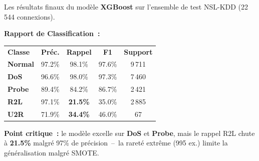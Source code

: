 \documentclass{article}
\newlength{\colW}  \setlength{\colW}{180mm}
\newlength{\gapW}  \setlength{\gapW}{15mm}
\newcommand{\bodyfont}{\fontsize{15.3}{20.5}\selectfont}
\newcommand{\smallfont}{\fontsize{13.5}{18}\selectfont}
\newcommand{\labelfont}{\fontsize{13.5}{17}\selectfont\bfseries}
\begin{document}
\hspace{\gapW}%
\begin{minipage}[t]{\colW}

\begin{tcolorbox}[pc, title={\faTrophy\; R\'esultats D\'etaill\'es}]
\bodyfont\color{TextMain}
Les r\'esultats finaux du mod\`ele \textbf{XGBoost} sur l'ensemble de test NSL-KDD (22\,544 connexions).

\vspace{5mm}
{\labelfont\color{CyanAccent}Rapport de Classification~:}
\vspace{2mm}

{\smallfont
\setlength{\tabcolsep}{2.5mm}
\renewcommand{\arraystretch}{1.5}
\begin{tabular}{@{}lcccc@{}}
\rowcolor{TableHead}
  \textcolor{TextMain}{\textbf{Classe}} &
  \textcolor{TextMain}{\textbf{Pr\'ec.}} &
  \textcolor{TextMain}{\textbf{Rappel}} &
  \textcolor{TextMain}{\textbf{F1}} &
  \textcolor{TextMain}{\textbf{Support}} \\
\textcolor{NormalColor}{\textbf{Normal}} & 97.2\% & 98.1\% & 97.6\% & 9\,711 \\
\rowcolor{RowAlt}
\textcolor{DosColor}{\textbf{DoS}}       & 96.6\% & 98.0\% & 97.3\% & 7\,460 \\
\textcolor{ProbeColor}{\textbf{Probe}}   & 89.4\% & 84.2\% & 86.7\% & 2\,421 \\
\rowcolor{RowAlt}
\textcolor{R2LColor}{\textbf{R2L}}       & 97.1\% & \textcolor{DosColor}{\textbf{21.5\%}} & 35.0\%  & 2\,885 \\
\textcolor{U2RColor}{\textbf{U2R}}       & 71.9\% & \textcolor{DosColor}{\textbf{34.4\%}} & 46.0\%  &    67 \\
\end{tabular}
}

\vspace{5mm}
\begin{tcolorbox}[alert]
\smallfont\color{TextMain}
\textcolor{DosColor}{\faExclamationTriangle}\; \textbf{Point critique~:} le mod\`ele excelle sur \textbf{DoS} et \textbf{Probe}, mais le rappel R2L chute \`a \textbf{21.5\%} malgr\'e 97\% de pr\'ecision~--~la raret\'e extr\^eme (995 ex.) limite la g\'en\'eralisation malgr\'e SMOTE.
\end{tcolorbox}
\end{tcolorbox}

\vspace{5mm}


\end{minipage}
\end{document}
